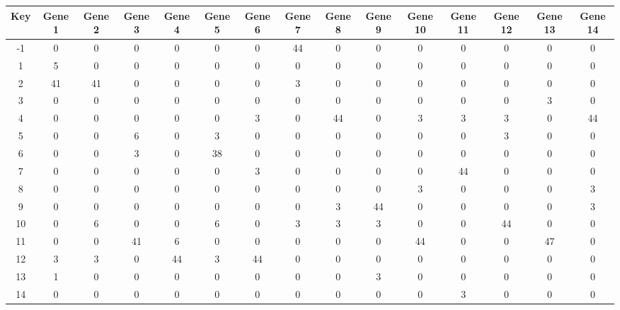 \begin{tabular}{|c|c|c|c|c|c|c|c|c|c|c|c|c|c|c|}
\hline
Key & Gene 1 & Gene 2 & Gene 3 & Gene 4 & Gene 5 & Gene 6 & Gene 7 & Gene 8 & Gene 9 & Gene 10 & Gene 11 & Gene 12 & Gene 13 & Gene 14 \\
\hline
-1 & 0 & 0 & 0 & 0 & 0 & 0 & 44 & 0 & 0 & 0 & 0 & 0 & 0 & 0 \\
1 & 5 & 0 & 0 & 0 & 0 & 0 & 0 & 0 & 0 & 0 & 0 & 0 & 0 & 0 \\
2 & 41 & 41 & 0 & 0 & 0 & 0 & 3 & 0 & 0 & 0 & 0 & 0 & 0 & 0 \\
3 & 0 & 0 & 0 & 0 & 0 & 0 & 0 & 0 & 0 & 0 & 0 & 0 & 3 & 0 \\
4 & 0 & 0 & 0 & 0 & 0 & 3 & 0 & 44 & 0 & 3 & 3 & 3 & 0 & 44 \\
5 & 0 & 0 & 6 & 0 & 3 & 0 & 0 & 0 & 0 & 0 & 0 & 3 & 0 & 0 \\
6 & 0 & 0 & 3 & 0 & 38 & 0 & 0 & 0 & 0 & 0 & 0 & 0 & 0 & 0 \\
7 & 0 & 0 & 0 & 0 & 0 & 3 & 0 & 0 & 0 & 0 & 44 & 0 & 0 & 0 \\
8 & 0 & 0 & 0 & 0 & 0 & 0 & 0 & 0 & 0 & 3 & 0 & 0 & 0 & 3 \\
9 & 0 & 0 & 0 & 0 & 0 & 0 & 0 & 3 & 44 & 0 & 0 & 0 & 0 & 3 \\
10 & 0 & 6 & 0 & 0 & 6 & 0 & 3 & 3 & 3 & 0 & 0 & 44 & 0 & 0 \\
11 & 0 & 0 & 41 & 6 & 0 & 0 & 0 & 0 & 0 & 44 & 0 & 0 & 47 & 0 \\
12 & 3 & 3 & 0 & 44 & 3 & 44 & 0 & 0 & 0 & 0 & 0 & 0 & 0 & 0 \\
13 & 1 & 0 & 0 & 0 & 0 & 0 & 0 & 0 & 3 & 0 & 0 & 0 & 0 & 0 \\
14 & 0 & 0 & 0 & 0 & 0 & 0 & 0 & 0 & 0 & 0 & 3 & 0 & 0 & 0 \\
\hline
\end{tabular}